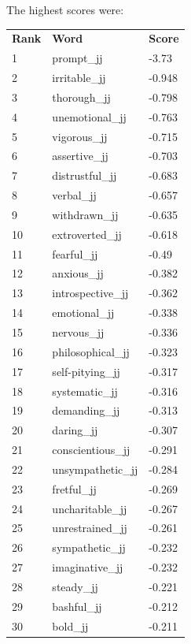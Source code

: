 \documentclass[10pt,letterpaper]{book}
\begin{document}
The highest scores were:
\begin{tabular}{ l l l }
        \textbf{Rank} & \textbf{Word} & \textbf{Score} \\
        1 & prompt\_jj & -3.73 \\
        2 & irritable\_jj & -0.948 \\
        3 & thorough\_jj & -0.798 \\
        4 & unemotional\_jj & -0.763 \\
        5 & vigorous\_jj & -0.715 \\
        6 & assertive\_jj & -0.703 \\
        7 & distrustful\_jj & -0.683 \\
        8 & verbal\_jj & -0.657 \\
        9 & withdrawn\_jj & -0.635 \\
        10 & extroverted\_jj & -0.618 \\
        11 & fearful\_jj & -0.49 \\
        12 & anxious\_jj & -0.382 \\
        13 & introspective\_jj & -0.362 \\
        14 & emotional\_jj & -0.338 \\
        15 & nervous\_jj & -0.336 \\
        16 & philosophical\_jj & -0.323 \\
        17 & self-pitying\_jj & -0.317 \\
        18 & systematic\_jj & -0.316 \\
        19 & demanding\_jj & -0.313 \\
        20 & daring\_jj & -0.307 \\
        21 & conscientious\_jj & -0.291 \\
        22 & unsympathetic\_jj & -0.284 \\
        23 & fretful\_jj & -0.269 \\
        24 & uncharitable\_jj & -0.267 \\
        25 & unrestrained\_jj & -0.261 \\
        26 & sympathetic\_jj & -0.232 \\
        27 & imaginative\_jj & -0.232 \\
        28 & steady\_jj & -0.221 \\
        29 & bashful\_jj & -0.212 \\
        30 & bold\_jj & -0.211 \\
\end{tabular}
\end{document}
